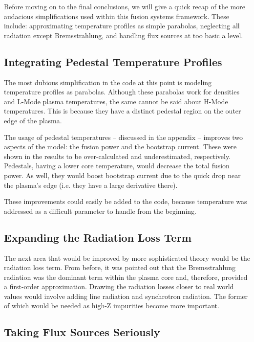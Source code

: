 Before moving on to the final conclusions, we will give a quick recap of the more audacious simplifications used within this fusion systems framework. These include: approximating temperature profiles as simple parabolas, neglecting all radiation except Bremsstrahlung, and handling flux sources at too basic a level.

\subsection{Integrating Pedestal Temperature Profiles}

The most dubious simplification in the code at this point is modeling temperature profiles as parabolas. Although these parabolas work for densities and L-Mode plasma temperatures, the same cannot be said about H-Mode temperatures. This is because they have a distinct pedestal region on the outer edge of the plasma.

The usage of pedestal temperatures -- discussed in the appendix -- improves two aspects of the model: the fusion power and the bootstrap current. These were shown in the results to be over-calculated and underestimated, respectively. Pedestals, having a lower core temperature, would decrease the total fusion power. As well, they would boost bootstrap current due to the quick drop near the plasma's edge (i.e. they have a large derivative there). 

These improvements could easily be added to the code, because temperature was addressed as a difficult parameter to handle from the beginning.

\subsection{Expanding the Radiation Loss Term}

The next area that would be improved by more sophisticated theory would be the radiation loss term. From before, it was pointed out that the Bremsstrahlung radiation was the dominant term within the plasma core and, therefore, provided a first-order approximation. Drawing the radiation losses closer to real world values would involve adding line radiation and synchrotron radiation. The former of which would be needed as high-Z impurities become more important.

\subsection{Taking Flux Sources Seriously}

